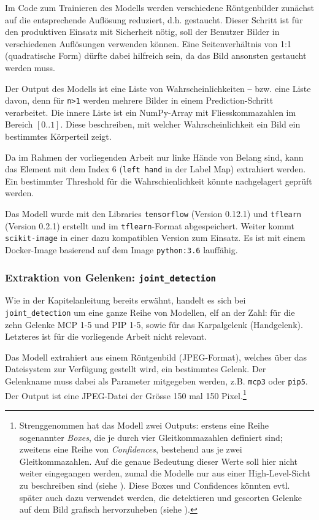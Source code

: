 Im Code zum Trainieren des Modells werden verschiedene Röntgenbilder zunächst auf die entsprechende Auflösung reduziert, d.h. gestaucht. Dieser Schritt ist für den produktiven Einsatz mit Sicherheit nötig, soll der Benutzer Bilder in verschiedenen Auflösungen verwenden können. Eine Seitenverhältnis von 1:1 (quadratische Form) dürfte dabei hilfreich sein, da das Bild ansonsten gestaucht werden muss.

Der Output des Modells ist eine Liste von Wahrscheinlichkeiten ‒ bzw. eine Liste davon, denn für \texttt{n>1} werden mehrere Bilder in einem Prediction-Schritt verarbeitet. Die innere Liste ist ein NumPy-Array mit Fliesskommazahlen im Bereich $[0..1]$. Diese beschreiben, mit welcher Wahrscheinlichkeit ein Bild ein bestimmtes Körperteil zeigt.

Da im Rahmen der vorliegenden Arbeit nur linke Hände von Belang sind, kann das Element mit dem Index 6 (\texttt{left hand} in der Label Map) extrahiert werden. Ein bestimmter Threshold für die Wahrschienlichkeit könnte nachgelagert geprüft werden.

Das Modell wurde mit den Libraries \texttt{tensorflow} (Version 0.12.1) und \texttt{tflearn} (Version 0.2.1) erstellt und im \texttt{tflearn}-Format abgespeichert. Weiter kommt \texttt{scikit-image} in einer dazu kompatiblen Version zum Einsatz. Es ist mit einem Docker-Image basierend auf dem Image \texttt{python:3.6} lauffähig.

\subsubsection{Extraktion von Gelenken: \texttt{joint\_detection}}
\label{sec:modell-joint-detection}

Wie in der Kapitelanleitung bereits erwähnt, handelt es sich bei \texttt{joint\_detection} um eine ganze Reihe von Modellen, elf an der Zahl: für die zehn Gelenke MCP 1-5 und PIP 1-5, sowie für das Karpalgelenk (Handgelenk). Letzteres ist für die vorliegende Arbeit nicht relevant.

Das Modell extrahiert aus einem Röntgenbild (JPEG-Format), welches über das Dateisystem zur Verfügung gestellt wird, ein bestimmtes Gelenk. Der Gelenkname muss dabei als Parameter mitgegeben werden, z.B. \texttt{mcp3} oder \texttt{pip5}. Der Output ist eine JPEG-Datei der Grösse 150 mal 150 Pixel.\footnote{Strenggenommen hat das Modell zwei Outputs: erstens eine Reihe sogenannter \textit{Boxes}, die je durch vier Gleitkommazahlen definiert sind; zweitens eine Reihe von \textit{Confidences}, bestehend aus je zwei Gleitkommazahlen. Auf die genaue Bedeutung dieser Werte soll hier nicht weiter eingegangen werden, zumal die Modelle nur aus einer High-Level-Sicht zu beschreiben sind (siehe ). Diese Boxes und Confidences könnten evtl. später auch dazu verwendet werden, die detektieren und gescorten Gelenke auf dem Bild grafisch hervorzuheben (siehe ).}

